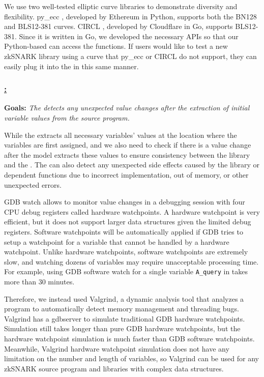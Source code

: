  We use two well-tested elliptic curve libraries to demonstrate diversity and flexibility.
py\_ecc \cite{pyecc}, developed by Ethereum in Python, supports both the BN128 and BLS12-381 curves. CIRCL \cite{circl}, developed by Cloudflare in Go, supports BLS12-381.  Since it is written in Go, we developed the necessary APIs so that our Python-based  can access the functions. If users would like to test a new zkSNARK library using a curve that py\_ecc or CIRCL do not support, they can easily plug it into the  in this same manner.



\subsubsection*{\underline{\SnarkFuzzer: }}
\label{subsec:snarkprobe-value-monitor}

\textbf{Goals: } \emph{The  detects any unexpected value changes after the extraction of initial variable values from the source program.}

%
While the  extracts all necessary variables' values at the location where the variables are first assigned, and we also need to check if there is a value change after the model extracts these values to ensure consistency between the library and the . The  can also detect any unexpected side effects caused by the library or dependent functions due to incorrect implementation, out of memory, or other unexpected errors.

%
GDB watch allows \SnarkFuzzer to monitor value changes in a debugging session with four CPU debug registers called hardware watchpoints. A hardware watchpoint is very efficient, but it does not support larger data structures given the limited debug registers. Software watchpoints will be automatically applied if GDB tries to setup a watchpoint for a variable that cannot be handled by a hardware watchpoint. Unlike hardware watchpoints, software watchpoints are extremely slow, and watching dozens of variables may require unacceptable processing time. For example, using GDB software watch for a single variable \texttt{A\_query} in \libsnark takes more than 30 minutes.

Therefore, we instead used Valgrind, a dynamic analysis tool that analyzes a program to automatically detect memory management and threading bugs. Valgrind has a gdbserver to simulate traditional GDB hardware watchpoints. Simulation still takes longer than pure GDB hardware watchpoints, but the hardware watchpoint simulation is much faster than GDB software watchpoints. Meanwhile, Valgrind hardware watchpoint simulation does not have any limitation on the number and length of variables, so Valgrind can be used for any zkSNARK source program and libraries with complex data structures.